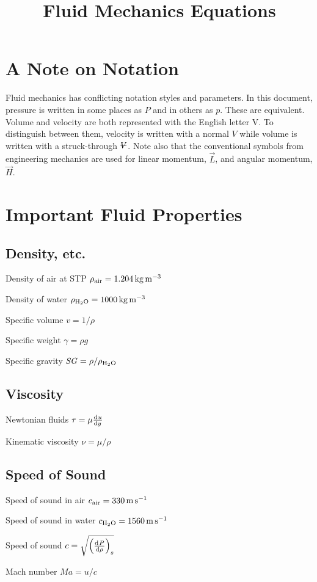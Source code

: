 \documentclass{article}
\title{Fluid Mechanics Equations}
\begin{document}


\section*{A Note on Notation}

Fluid mechanics has conflicting notation styles and parameters.  In this document, pressure is
written in some places as $P$ and in others as $p$. These are equivalent.  Volume and velocity are
both represented with the English letter V.  To distinguish between them, velocity is written with a
normal $V$ while volume is written with a struck-through $\volsym$.  Note also that the conventional
symbols from engineering mechanics are used for linear momentum, $\vec{L}$, and angular momentum,
$\vec{H}$.

\section{Important Fluid Properties}

\subsection{Density, etc.}
\begin{description*}
\item[Density of air at STP]
  \(\rho_{\mathrm{air}} = \SI{1.204}{\kilo\gram\per\cubic\meter}\)
\item[Density of water]
  \(\rho_{\mathrm{H_2O}} = \SI{1000}{\kilo\gram\per\cubic\meter}\)
\item[Specific volume]
  \(v = 1/\rho\)
\item[Specific weight]
  \(\gamma = \rho g\)
\item[Specific gravity]
  \(\mathit{SG} = \rho / \rho_{\mathrm{H_2O}}\)
\end{description*}

\subsection{Viscosity}
\begin{description*}
\item[Newtonian fluids]
  \(\tau = \mu \od{u}{y}\)
\item[Kinematic viscosity]
  \(\nu = \mu / \rho\)
\end{description*}

\subsection{Speed of Sound}
\begin{description*}
\item[Speed of sound in air]
  \(c_{\mathrm{air}} = \SI{330}{\meter\per\second}\)
\item[Speed of sound in water]
  \(c_{\mathrm{H_2O}} = \SI{1560}{\meter\per\second}\)
\item[Speed of sound]
  \(c = \sqrt{{\left(\od{P}{\rho}\right)}_s}\)
\item[Mach number]
  \(\mathit{Ma} = u/c\)
\end{description*}
\end{document}
